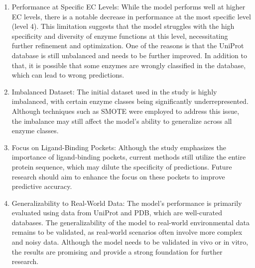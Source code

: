 \begin{enumerate}
    \item Performance at Specific EC Levels: While the model performs well at higher EC levels, there is a notable decrease in performance at the most specific level (level 4). This limitation suggests that the model struggles with the high specificity and diversity of enzyme functions at this level, necessitating further refinement and optimization. One of the reasons is that the UniProt database is still unbalanced and needs to be further improved. In addition to that, it is possible that some enzymes are wrongly classified in the database, which can lead to wrong predictions.
    \item Imbalanced Dataset: The initial dataset used in the study is highly imbalanced, with certain enzyme classes being significantly underrepresented. Although techniques such as SMOTE were employed to address this issue, the imbalance may still affect the model's ability to generalize across all enzyme classes.
    \item Focus on Ligand-Binding Pockets: Although the study emphasizes the importance of ligand-binding pockets, current methods still utilize the entire protein sequence, which may dilute the specificity of predictions. Future research should aim to enhance the focus on these pockets to improve predictive accuracy.
    \item Generalizability to Real-World Data: The model's performance is primarily evaluated using data from UniProt and PDB, which are well-curated databases. The generalizability of the model to real-world environmental data remains to be validated, as real-world scenarios often involve more complex and noisy data. Although the model needs to be validated in vivo or in vitro, the results are promising and provide a strong foundation for further research.
\end{enumerate}